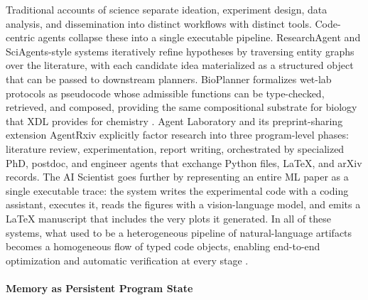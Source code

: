 \documentclass{llmxive}
\begin{document}
Traditional accounts of science separate ideation, experiment design, data analysis, and dissemination into distinct workflows with distinct tools. Code-centric agents collapse these into a single executable pipeline. ResearchAgent \citep{baek2025researchagentiterativeresearchidea} and SciAgents-style systems iteratively refine hypotheses by traversing entity graphs over the literature, with each candidate idea materialized as a structured object that can be passed to downstream planners. BioPlanner \citep{odonoghue2023bioplannerautomaticevaluationllms} formalizes wet-lab protocols as pseudocode whose admissible functions can be type-checked, retrieved, and composed, providing the same compositional substrate for biology that XDL provides for chemistry \citep{mehr2020universal}. Agent Laboratory \citep{schmidgall2025agentlaboratoryusingllm} and its preprint-sharing extension AgentRxiv \citep{schmidgall2025agentrxivcollaborativeautonomousresearch} explicitly factor research into three program-level phases: literature review, experimentation, report writing, orchestrated by specialized PhD, postdoc, and engineer agents that exchange Python files, LaTeX, and arXiv records. The AI Scientist \citep{lu2024aiscientistfullyautomated,yamada2025aiscientistv2workshoplevelautomated} goes further by representing an entire ML paper as a single executable trace: the system writes the experimental code with a coding assistant, executes it, reads the figures with a vision-language model, and emits a LaTeX manuscript that includes the very plots it generated. In all of these systems, what used to be a heterogeneous pipeline of natural-language artifacts becomes a homogeneous flow of typed code objects, enabling end-to-end optimization and automatic verification at every stage \citep{ren2026scientificintelligencesurveyllmbased,wang2024executablecodeactionselicit}.

\paragraph{Memory as Persistent Program State}
\end{document}
